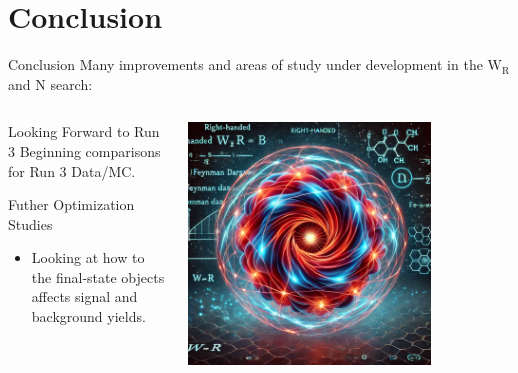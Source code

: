 \documentclass[aspectratio=169]{beamer}
\newcommand{\ssection}[1]{%
  \section{#1}%
  \sectionframe{#1}%
}%
\begin{document}
\section{Conclusion} %

\begin{frame}{Conclusion}
  Many improvements and areas of study under development in the $\mathrm{W_R}$ and $\mathrm{N}$ search:

  \begin{columns} %
    \begin{column}{0.5\textwidth}
      \begin{block}{Looking Forward to Run 3}
        Beginning comparisons for Run 3 Data/MC.
      \end{block}

      \begin{block}{Futher Optimization Studies}
        \begin{itemize}
          \item Looking at how  to the final‐state objects affects 
          signal and background yields.
        \end{itemize}
      
      \end{block}
    \end{column}

    \begin{column}{0.5\textwidth}
      \centering
      \includegraphics[width=0.75\textwidth]{wr-boson-chatgpt.png}
    \end{column}
  \end{columns}
\end{frame}
\end{document}
